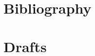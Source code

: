 \documentclass[10pt,letterpaper,onecolumn,draftclsnofoot]{IEEEtran}
\begin{document}
\section{Bibliography}



\clearpage
\section{Drafts}





\end{document}
